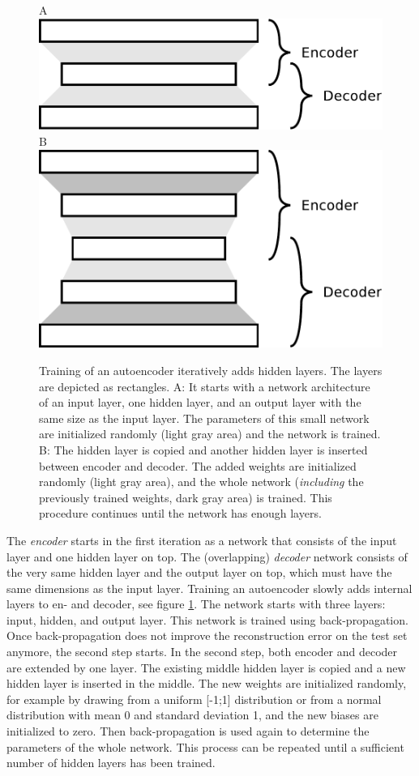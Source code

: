 \begin{figure}
\begin{centering}
\hfill{}A \includegraphics[width=0.4\columnwidth]{images/autoencoder-1}\hfill{}B
\includegraphics[width=0.4\columnwidth]{images/autoencoder-2}\hfill{}
\par\end{centering}
\caption[Training of an autoencoder.]{\label{fig:Training-of-an-autoencoder}Training of an autoencoder
iteratively adds hidden layers. The layers are depicted as rectangles.
 A: It starts with a network architecture of an input layer, one
hidden layer, and an output layer with the same size as the input
layer. The parameters of this small network are initialized randomly
(light gray area) and the network is trained. B: The hidden layer
is copied and another hidden layer is inserted between encoder and
decoder. The added weights are initialized randomly (light gray area),
and the whole network (\emph{including }the previously trained weights,
dark gray area) is trained. This procedure continues until the network
has enough layers.}
\end{figure}

The \emph{encoder} starts in the first iteration as
a network that consists of the input layer and one hidden layer on
top. The (overlapping) \emph{decoder} network consists
of the very same hidden layer and the output layer on top, which must
have the same dimensions as the input layer. Training an autoencoder
slowly adds internal layers to en- and decoder, see figure \ref{fig:Training-of-an-autoencoder}.
The network starts with three layers: input, hidden, and output layer.
This network is trained using back-propagation. Once back-propagation
does not improve the reconstruction error on the test set anymore,
the second step starts. In the second step, both encoder and decoder
are extended by one layer. The existing middle hidden layer is copied
and a new hidden layer is inserted in the middle. The new weights
are initialized randomly, for example by drawing from a uniform {[}-1;1{]}
distribution or from a normal distribution with mean 0 and standard
deviation 1, and the new biases are initialized to zero. Then back-propagation
is used again to determine the parameters of the whole network. This
process can be repeated until a sufficient number of hidden layers
has been trained.

